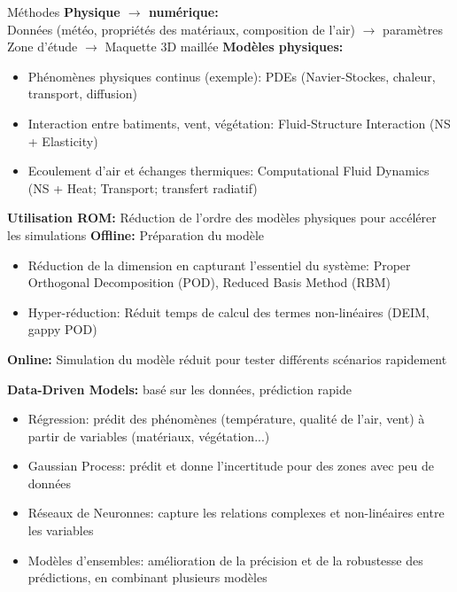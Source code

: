 \documentclass{beamer}
\begin{document}
\begin{frame}{Méthodes}
    \textbf{Physique $\rightarrow$ numérique:}  \\
    Données (météo, propriétés des matériaux, composition de l'air) $\rightarrow$ paramètres \hspace{1cm}  Zone d'étude $\rightarrow$ Maquette 3D maillée %
    \textbf{Modèles physiques:}
    \begin{itemize}
        \item Phénomènes physiques continus (exemple): PDEs (Navier-Stockes, chaleur, transport, diffusion)
        \item Interaction entre batiments, vent, végétation: Fluid-Structure Interaction (NS + Elasticity)
        \item Ecoulement d'air et échanges thermiques: Computational Fluid Dynamics (NS + Heat; Transport; transfert radiatif) %
    \end{itemize}

    \textbf{Utilisation ROM:} Réduction de l'ordre des modèles physiques pour accélérer les simulations 
    \textbf{Offline:} Préparation du modèle
    \begin{itemize}
        \item Réduction de la dimension en capturant l'essentiel du système: Proper Orthogonal Decomposition (POD), Reduced Basis Method (RBM)
        \item Hyper-réduction: Réduit temps de calcul des termes non-linéaires (DEIM, gappy POD) %
    \end{itemize}
    \textbf{Online:} Simulation du modèle réduit pour tester différents scénarios rapidement

    \textbf{Data-Driven Models:} basé sur les données, prédiction rapide %
    \begin{itemize}
        \item Régression: prédit des phénomènes (température, qualité de l'air, vent) à partir de variables (matériaux, végétation...) 
        \item Gaussian Process: prédit et donne l'incertitude pour des zones avec peu de données
        \item Réseaux de Neuronnes: capture les relations complexes et non-linéaires entre les variables 
        \item Modèles d'ensembles: amélioration de la précision et de la robustesse des prédictions, en combinant plusieurs modèles
    \end{itemize}


\end{frame}
\end{document}
